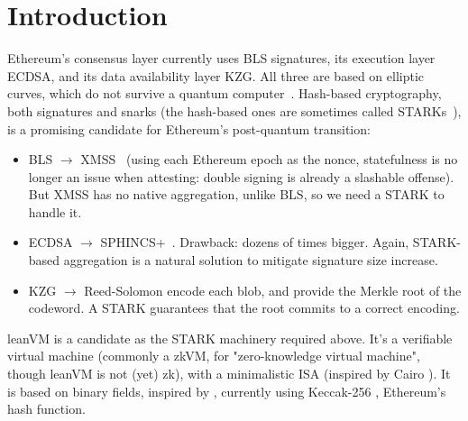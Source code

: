 \section{Introduction}\label{sec:intro}

Ethereum's consensus layer currently uses BLS signatures, its execution layer ECDSA, and its data availability layer KZG. All three are based on elliptic curves, which do not survive a quantum computer~\cite{shor}. Hash-based cryptography, both signatures and snarks (the hash-based ones are sometimes called STARKs~\cite{stark}), is a promising candidate for Ethereum's post-quantum transition:
\begin{itemize}[itemsep=1pt,topsep=3pt]
\item BLS $\to$ XMSS~\cite{rfc8391} (using each Ethereum epoch as the nonce, statefulness is no longer an issue when attesting: double signing is already a slashable offense). But XMSS has no native aggregation, unlike BLS, so we need a STARK to handle it.
\item ECDSA $\to$ SPHINCS+~\cite{sphincs}. Drawback: dozens of times bigger. Again, STARK-based aggregation is a natural solution to mitigate signature size increase.
\item KZG $\to$ Reed-Solomon encode each blob, and provide the Merkle root of the codeword. A STARK guarantees that the root commits to a correct encoding.
\end{itemize}

\vspace{4mm}

leanVM is a candidate as the STARK machinery required above. It's a verifiable virtual machine (commonly a zkVM, for "zero-knowledge virtual machine", though leanVM is not (yet) zk), with a minimalistic ISA (inspired by Cairo \cite{cairo}). It is based on binary fields, inspired by \cite{DP24}, currently using Keccak-256 \cite{keccak}, Ethereum's hash function.
